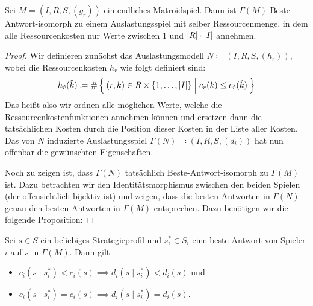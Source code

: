 \begin{satz}\label{satz:BAPotentialFuerMatroidspiele}
	Sei $M = (I, R, S, (g_r))$ ein endliches Matroidspiel. Dann ist $\Gamma(M)$ Beste-Antwort-isomorph zu einem Auslastungsspiel mit selber Ressourcenmenge, in dem alle Ressourcenkosten nur Werte zwischen $1$ und $\left|R\right|\cdot\left|I\right|$ annehmen.
\end{satz}

\begin{proof}
	Wir definieren zunächst das Auslastungsmodell $N \coloneqq (I, R, S, (h_r))$, wobei die Ressourcenkosten $h_r$ wie folgt definiert sind:
		\[h_{\hat{r}}(\hat{k}) \coloneqq \#\Set{(r, k) \in R\times \{1, \dots, \left|I\right|\} | c_r(k) \leq c_{\hat{r}}(\hat{k})} \]
	Das heißt also wir ordnen alle möglichen Werte, welche die Ressourcenkostenfunktionen annehmen können und ersetzen dann die tatsächlichen Kosten durch die Position dieser Kosten in der Liste aller Kosten. Das von $N$ induzierte Auslastungsspiel $\Gamma(N) \eqqcolon (I, R, S, (d_i))$ hat nun offenbar die gewünschten Eigenschaften. 
	
	Noch zu zeigen ist, dass $\Gamma(N)$ tatsächlich Beste-Antwort-isomorph zu $\Gamma(M)$ ist. Dazu betrachten wir den Identitätsmorphismus zwischen den beiden Spielen (der offensichtlich bijektiv ist) und zeigen, dass die besten Antworten in $\Gamma(N)$ genau den besten Antworten in $\Gamma(M)$ entsprechen. Dazu benötigen wir die folgende Proposition:	\noqed
\end{proof}
	
\begin{prop}\label{prop:BAPotentialFuerMatroidspieleHilfsP}
	Sei $s \in S$ ein beliebiges Strategieprofil und $s^\ast_i \in S_i$ eine beste Antwort von Spieler $i$ auf $s$ in $\Gamma(M)$. Dann gilt
	\begin{itemize}
		\item $c_i(s \mid s^\ast_i) < c_i(s) \implies d_i(s \mid s^\ast_i) < d_i(s)$ und
		\item $c_i(s \mid s^\ast_i) = c_i(s) \implies d_i(s \mid s^\ast_i) = d_i(s)$.
	\end{itemize}
\end{prop}

